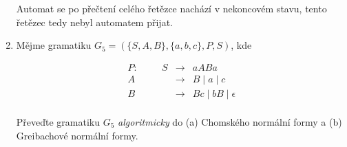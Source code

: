 \documentclass[a4paper,11pt]{article}[24.3.2010]
\begin{document}
\begin{enumerate}
  Automat se po přečtení celého řetězce nachází v nekoncovém stavu, tento řetězec tedy nebyl automatem přijat. 

  \newpage

\newpage

\item Mějme gramatiku $G_{5}=(\{S,A,B\},\{a,b,c\},P,S)$, kde

\begin{eqnarray*}
      P: \:\:\:\:\:\:\:\:\:\:\: S&\rightarrow&aABa\\
      A&\rightarrow&B \mid a \mid c\\
      B&\rightarrow&Bc \mid bB \mid \epsilon\\
\end{eqnarray*}

Převeďte gramatiku $G_{5}$ \emph{algoritmicky} do (a) Chomského normální formy a (b) Greibachové normální formy.\\


\end{enumerate}
\end{document}
